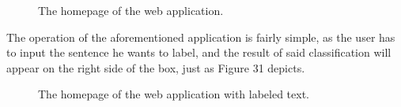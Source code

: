 \documentclass[12pt,a4paper]{article}
\begin{document}
\begin{figure}[h!]
\begin{center}
\end{center}
\caption{The homepage of the web application.}
\end{figure}

\qquad The operation of the aforementioned application is fairly simple, as the user has to input the sentence he wants to label, and the result of said classification will appear on the right side of the box, just as Figure 31 depicts.

\begin{figure}[h!]
\begin{center}
\end{center}
\caption{The homepage of the web application with labeled text.}
\end{figure}
\end{document}
